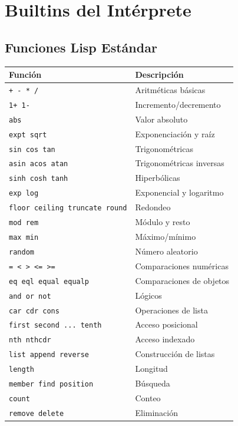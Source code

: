 \chapter{Builtins del Intérprete}
\label{app:builtins}

\section*{Funciones Lisp Estándar}

\begin{center}
\begin{longtable}{ll}
\toprule
\textbf{Función} & \textbf{Descripción} \\
\midrule
\endhead
\bottomrule
\endfoot
\texttt{+ - * /} & Aritméticas básicas \\
\texttt{1+ 1-} & Incremento/decremento \\
\texttt{abs} & Valor absoluto \\
\texttt{expt sqrt} & Exponenciación y raíz \\
\texttt{sin cos tan} & Trigonométricas \\
\texttt{asin acos atan} & Trigonométricas inversas \\
\texttt{sinh cosh tanh} & Hiperbólicas \\
\texttt{exp log} & Exponencial y logaritmo \\
\texttt{floor ceiling truncate round} & Redondeo \\
\texttt{mod rem} & Módulo y resto \\
\texttt{max min} & Máximo/mínimo \\
\texttt{random} & Número aleatorio \\
\texttt{= < > <= >=} & Comparaciones numéricas \\
\texttt{eq eql equal equalp} & Comparaciones de objetos \\
\texttt{and or not} & Lógicos \\
\texttt{car cdr cons} & Operaciones de lista \\
\texttt{first second ... tenth} & Acceso posicional \\
\texttt{nth nthcdr} & Acceso indexado \\
\texttt{list append reverse} & Construcción de listas \\
\texttt{length} & Longitud \\
\texttt{member find position} & Búsqueda \\
\texttt{count} & Conteo \\
\texttt{remove delete} & Eliminación \\

\end{longtable}
\end{center}
